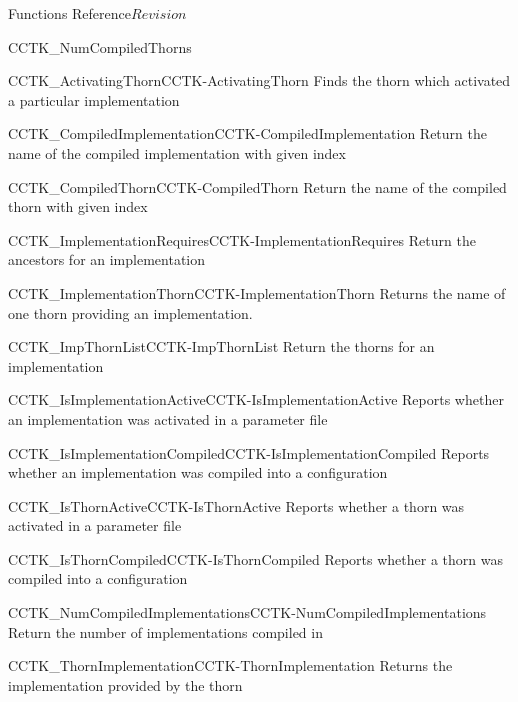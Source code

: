 \begin{cactuspart}{ Functions Reference}{}{$Revision$}
\begin{FunctionDescription}{CCTK\_NumCompiledThorns}
\begin{SeeAlsoSection}
\begin{SeeAlso2}{CCTK\_ActivatingThorn}{CCTK-ActivatingThorn}
  Finds the thorn which activated a particular implementation
\end{SeeAlso2}
\begin{SeeAlso2}{CCTK\_CompiledImplementation}{CCTK-CompiledImplementation}
  Return the name of the compiled implementation with given index
\end{SeeAlso2}
\begin{SeeAlso2}{CCTK\_CompiledThorn}{CCTK-CompiledThorn}
  Return the name of the compiled thorn with given index
\end{SeeAlso2}
\begin{SeeAlso2}{CCTK\_ImplementationRequires}{CCTK-ImplementationRequires}
  Return the ancestors for an implementation
\end{SeeAlso2}
\begin{SeeAlso2}{CCTK\_ImplementationThorn}{CCTK-ImplementationThorn}
  Returns the name of one thorn providing an implementation.
\end{SeeAlso2}
\begin{SeeAlso2}{CCTK\_ImpThornList}{CCTK-ImpThornList}
  Return the thorns for an implementation
\end{SeeAlso2}
\begin{SeeAlso2}{CCTK\_IsImplementationActive}{CCTK-IsImplementationActive}
  Reports whether an implementation was activated in a parameter file
\end{SeeAlso2}
\begin{SeeAlso2}{CCTK\_IsImplementationCompiled}{CCTK-IsImplementationCompiled}
  Reports whether an implementation was compiled into a configuration
\end{SeeAlso2}
\begin{SeeAlso2}{CCTK\_IsThornActive}{CCTK-IsThornActive}
  Reports whether a thorn was activated in a parameter file
\end{SeeAlso2}
\begin{SeeAlso2}{CCTK\_IsThornCompiled}{CCTK-IsThornCompiled}
  Reports whether a thorn was compiled into a configuration
\end{SeeAlso2}
\begin{SeeAlso2}{CCTK\_NumCompiledImplementations}{CCTK-NumCompiledImplementations}
  Return the number of implementations compiled in
\end{SeeAlso2}
\begin{SeeAlso2}{CCTK\_ThornImplementation}{CCTK-ThornImplementation}
  Returns the implementation provided by the thorn
\end{SeeAlso2}
\end{SeeAlsoSection}


\end{FunctionDescription}
\end{cactuspart}
